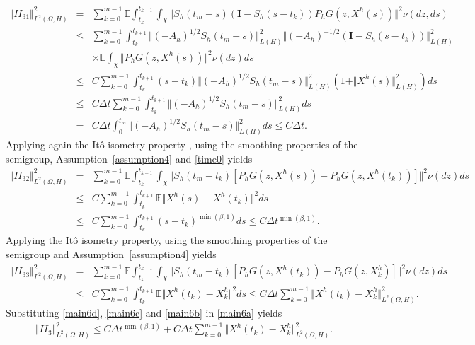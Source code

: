 \documentclass[review,12pt]{elsarticle}
\newcommand{\assref}[1]{{Assumption~\ref{#1}}}
\begin{document}
\begin{eqnarray}
\label{main6b}
\Vert II_{31}\Vert^2_{L^2(\Omega, H)}
&=&\sum_{k=0}^{m-1}\mathbb{E}\int_{t_k}^{t_{k+1}}\int_{\chi}\Vert S_h(t_m-s)(\mathbf{I}-S_h(s-t_k))P_hG(z, X^h(s))\Vert^2\nu(dz, ds)\nonumber\\
&\leq& \sum_{k=0}^{m-1}\int_{t_k}^{t_{k+1}}\Vert (-A_h)^{1/2}S_h(t_m-s)\Vert^2_{L(H)}\Vert (-A_h)^{-1/2}(\mathbf{I}-S_h(s-t_k))\Vert^2_{L(H)}\nonumber\\
&&\times\mathbb{E}\int_{\chi}\Vert P_hG(z, X^h(s))\Vert^2\nu(dz)ds\nonumber\\
&\leq& C\sum_{k=0}^{m-1}\int_{t_k}^{t_{k+1}}(s-t_k)\Vert(-A_h)^{1/2}S_h(t_m-s)\Vert^2_{L(H)}\left(1+\Vert X^h(s)\Vert^2_{L(H)}\right)ds\nonumber\\
&\leq& C\Delta t\sum_{k=0}^{m-1}\int_{t_k}^{t_{k+1}}\Vert(-A_h)^{1/2}S_h(t_m-s)\Vert^2_{L(H)}ds\nonumber\\
&=&C\Delta t\int_0^{t_m}\Vert(-A_h)^{1/2}S_h(t_m-s)\Vert^2_{L(H)}ds\leq C\Delta t.
\end{eqnarray}
Applying again the It\^{o} isometry property \cite[(3.5.6)]{Rudiger}, using  the smoothing properties of the semigroup, \assref{assumption4} and \eqref{time0} yields
\begin{eqnarray}
\label{main6c}
\Vert II_{32}\Vert^2_{L^2(\Omega, H)}&=&\sum_{k=0}^{m-1}\mathbb{E}\int_{t_k}^{t_{k+1}}\int_{\chi}\Vert S_h(t_m-t_k)[P_hG(z, X^h(s))-P_hG(z, X^h(t_k))]\Vert^2\nu(dz)ds\nonumber\\
&\leq& C\sum_{k=0}^{m-1}\int_{t_k}^{t_{k+1}}\mathbb{E}\Vert X^h(s)-X^h(t_k)\Vert^2ds\nonumber\\
&\leq& C\sum_{k=0}^{m-1}\int_{t_k}^{t_{k+1}}(s-t_k)^{\min(\beta, 1)}ds\leq C\Delta t^{\min(\beta,1)}.
\end{eqnarray}
Applying the It\^{o} isometry property,  using the smoothing properties of the semigroup and  \assref{assumption4}  yields
\begin{eqnarray}
\label{main6d}
\Vert II_{33}\Vert^2_{L^2(\Omega, H)}&=&\sum_{k=0}^{m-1}\mathbb{E}\int_{t_k}^{t_{k+1}}\int_{\chi}\Vert S_h(t_m-t_k)[P_hG(z, X^h(t_k))-P_hG(z, X^h_k)]\Vert^2\nu(dz)ds\\
&\leq& C\sum_{k=0}^{m-1}\int_{t_k}^{t_{k+1}}\mathbb{E}\Vert X^h(t_k)-X^h_k\Vert^2ds\leq C\Delta t\sum_{k=0}^{m-1}\Vert X^h(t_k)-X^h_k\Vert^2_{L^2(\Omega, H)}.\nonumber
\end{eqnarray}
Substituting \eqref{main6d}, \eqref{main6c} and \eqref{main6b} in \eqref{main6a} yields
\begin{eqnarray}
\label{main6}
\Vert II_3\Vert^2_{L^2(\Omega, H)}\leq C\Delta t^{\min(\beta, 1)}+C\Delta t\sum_{k=0}^{m-1}\Vert X^h(t_k)-X^h_k\Vert^2_{L^2(\Omega, H)}.
\end{eqnarray}
\end{document}
